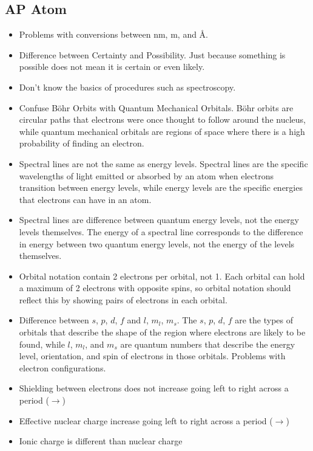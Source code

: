     \subsection{AP Atom}
        \begin{itemize}
            \item Problems with conversions between nm, m, and Å.
            \item Difference between Certainty and Possibility. Just because something is possible does not mean it is certain or even likely.
            \item Don't know the basics of procedures such as spectroscopy.
            \item Confuse Böhr Orbits with Quantum Mechanical Orbitals. Böhr orbits are circular paths that electrons were once thought to follow around the nucleus, while quantum mechanical orbitals are regions of space where there is a high probability of finding an electron.
            \item Spectral lines are not the same as energy levels. Spectral lines are the specific wavelengths of light emitted or absorbed by an atom when electrons transition between energy levels, while energy levels are the specific energies that electrons can have in an atom.
            \item Spectral lines are difference between quantum energy levels, not the energy levels themselves. The energy of a spectral line corresponds to the difference in energy between two quantum energy levels, not the energy of the levels themselves.
            \item Orbital notation contain 2 electrons per orbital, not 1. Each orbital can hold a maximum of 2 electrons with opposite spins, so orbital notation should reflect this by showing pairs of electrons in each orbital.
            \item Difference between $s$, $p$, $d$, $f$ and $l$, $m_l$, $m_s$. The $s$, $p$, $d$, $f$ are the types of orbitals that describe the shape of the region where electrons are likely to be found, while $l$, $m_l$, and $m_s$ are quantum numbers that describe the energy level, orientation, and spin of electrons in those orbitals.
            Problems with electron configurations.
            \item Shielding between electrons does not increase going left to right across a period ($\rightarrow$)
            \item Effective nuclear charge increase going left to right across a period ($\rightarrow$)
            \item Ionic charge is different than nuclear charge

\end{itemize}
